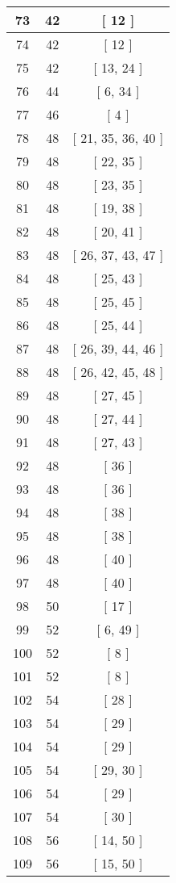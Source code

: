 \begin{center}
\begin{longtable}[H]{|| c c c ||}
\hline
73 & 42 & [ 12 ] \\ 
\hline
74 & 42 & [ 12 ] \\ 
\hline
75 & 42 & [ 13, 24 ] \\ 
\hline
76 & 44 & [ 6, 34 ] \\ 
\hline
77 & 46 & [ 4 ] \\ 
\hline
78 & 48 & [ 21, 35, 36, 40 ] \\ 
\hline
79 & 48 & [ 22, 35 ] \\ 
\hline
80 & 48 & [ 23, 35 ] \\ 
\hline
81 & 48 & [ 19, 38 ] \\ 
\hline
82 & 48 & [ 20, 41 ] \\ 
\hline
83 & 48 & [ 26, 37, 43, 47 ] \\ 
\hline
84 & 48 & [ 25, 43 ] \\ 
\hline
85 & 48 & [ 25, 45 ] \\ 
\hline
86 & 48 & [ 25, 44 ] \\ 
\hline
87 & 48 & [ 26, 39, 44, 46 ] \\ 
\hline
88 & 48 & [ 26, 42, 45, 48 ] \\ 
\hline
89 & 48 & [ 27, 45 ] \\ 
\hline
90 & 48 & [ 27, 44 ] \\ 
\hline
91 & 48 & [ 27, 43 ] \\ 
\hline
92 & 48 & [ 36 ] \\ 
\hline
93 & 48 & [ 36 ] \\ 
\hline
94 & 48 & [ 38 ] \\ 
\hline
95 & 48 & [ 38 ] \\ 
\hline
96 & 48 & [ 40 ] \\ 
\hline
97 & 48 & [ 40 ] \\ 
\hline
98 & 50 & [ 17 ] \\ 
\hline
99 & 52 & [ 6, 49 ] \\ 
\hline
100 & 52 & [ 8 ] \\ 
\hline
101 & 52 & [ 8 ] \\ 
\hline
102 & 54 & [ 28 ] \\ 
\hline
103 & 54 & [ 29 ] \\ 
\hline
104 & 54 & [ 29 ] \\ 
\hline
105 & 54 & [ 29, 30 ] \\ 
\hline
106 & 54 & [ 29 ] \\ 
\hline
107 & 54 & [ 30 ] \\ 
\hline
108 & 56 & [ 14, 50 ] \\ 
\hline
109 & 56 & [ 15, 50 ] \\ 

\end{longtable}
\end{center}
